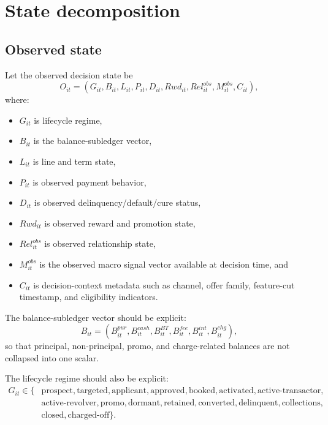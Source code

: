 \documentclass[11pt]{article}
\newcommand{\1}{\mathbf{1}}
\theoremstyle{definition}
\begin{document}
\section{State decomposition}

\subsection{Observed state}

Let the observed decision state be
\begin{equation}
  O_{it}
  =
  (G_{it},B_{it},L_{it},P_{it},D_{it},Rwd_{it},Rel^{obs}_{it},M^{obs}_{it},C_{it}),
  \label{eq:observed-state}
\end{equation}
where:
\begin{itemize}[leftmargin=*]
  \item $G_{it}$ is lifecycle regime,
  \item $B_{it}$ is the balance-subledger vector,
  \item $L_{it}$ is line and term state,
  \item $P_{it}$ is observed payment behavior,
  \item $D_{it}$ is observed delinquency/default/cure status,
  \item $Rwd_{it}$ is observed reward and promotion state,
  \item $Rel^{obs}_{it}$ is observed relationship state,
  \item $M^{obs}_{it}$ is the observed macro signal vector available at decision
        time, and
  \item $C_{it}$ is decision-context metadata such as channel, offer family,
        feature-cut timestamp, and eligibility indicators.
\end{itemize}

The balance-subledger vector should be explicit:
\begin{equation}
  B_{it}
  =
  (B^{pur}_{it},B^{cash}_{it},B^{BT}_{it},B^{fee}_{it},B^{int}_{it},B^{chg}_{it}),
  \label{eq:balance-subledger}
\end{equation}
so that principal, non-principal, promo, and charge-related balances are not
collapsed into one scalar.

The lifecycle regime should also be explicit:
\begin{equation}
  \begin{split}
  G_{it}\in\{&
    \text{prospect},\text{targeted},\text{applicant},
    \text{approved},\text{booked},\text{activated},
    \text{active-transactor},\\
    &\text{active-revolver},\text{promo},\text{dormant},
    \text{retained},\text{converted},\text{delinquent},
    \text{collections},\\
    &\text{closed},\text{charged-off}\}.
  \end{split}
  \label{eq:lifecycle-regime}
\end{equation}
\end{document}
